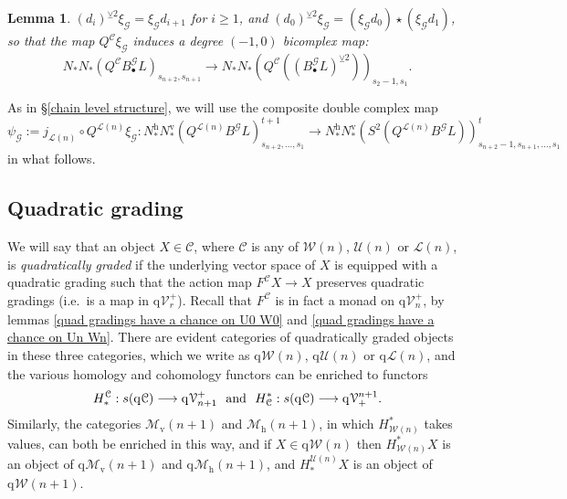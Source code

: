 \documentclass[11pt]{amsart} \renewcommand{\baselinestretch}{1.4}
\theoremstyle{plain}
\newtheorem{lem}[thm]{Lemma}
\theoremstyle{definition}
\renewcommand{\to}{\longrightarrow}
\newcommand{\scrG}{\mathscr{G}}
\newcommand{\calL}{\mathcal{L}}
\newcommand{\calV}{\mathcal{V}}
\newcommand{\calw}{\mathcal{W}}
\newcommand{\calu}{\mathcal{U}}
\newcommand{\call}{\mathcal{L}}
\newcommand{\calc}{\mathcal{C}}
\newcommand{\calMv}{\mathcal{M}\dver}
\newcommand{\calMh}{\mathcal{M}\dhor}
\newcommand{\vect}[2]{\calV^{#1}_{#2}}
\newcommand{\BSW}{{\scrG}}
\newcommand{\BSWres}{B^\BSW}%
\newcommand{\quadgrad}[1]{\mathrm{q}_{#1}}
\newcommand{\uver}{^\mathrm{v}}
\newcommand{\uhor}{^\mathrm{h}}
\newcommand{\dver}{_\mathrm{v}}
\newcommand{\dhor}{_\mathrm{h}}
\newcommand{\smashcoprod}{\veebar}%
\begin{document}
\begin{Composite functor spectral sequences}
\begin{lem}
$(d_i)^{\smashcoprod 2}\xi_\BSW =\xi_\BSW d_{i+1}$ for $i\geq1$, and $(d_0)^{\smashcoprod 2}\xi_\BSW = (\xi_\BSW d_{0})\star(\xi_\BSW d_{1})$, so that the map $Q^{\calc}\xi_\BSW $ induces a degree $(-1,0)$ bicomplex map:
\[N_*N_*(Q^{\calc}B^\BSW_{\bullet}L)_{s_{n+2},s_{n+1}}\to
  N_*N_*(Q^{\calc}((B^\BSW_{\bullet}L)^{\smashcoprod 2}))_{s_2-1,s_1}.\]
\end{lem}
As in \S\ref{chain level structure}, we will use the composite double complex map
\[\psi_\BSW:=j_{\calL(n)}\circ Q^{\calL(n)}\xi_\BSW:N\uhor_*N\uver_*(Q^{\calL(n)}\BSWres L)_{s_{n+2},\ldots,s_1}^{t+1}\to N\uhor_*N\uver_*(S^2(Q^{\calL(n)}\BSWres L))_{s_{n+2}-1,s_{n+1},\ldots,s_1}^{t}\]
in what follows.


\subsection{Quadratic grading}
\label{Quadratic grading}
We will say that an object $X\in\calc$, where $\calc$ is any of $\calw(n)$, $\calu(n)$ or $\call(n)$, is \emph{quadratically graded} if the underlying vector space of $X$ is equipped with a quadratic grading such that the action map
$F^{\calc}X\to X$ 
preserves quadratic gradings (i.e.\ is a map in $\quadgrad{}\vect{+}{r}$).
Recall that $F^{\calc}$ is in fact a monad on $\quadgrad{}\vect{+}{n}$, by lemmas \ref{quad gradings have a chance on U0 W0} and \ref{quad gradings have a chance on Un Wn}. There are evident categories of quadratically graded objects in these three categories, which we write as $\quadgrad{}\calw(n)$, $\quadgrad{}\calu(n)$ or $\quadgrad{}\call(n)$, and the various homology and cohomology functors can be enriched to functors
\[H_*^{\calc}:s(\quadgrad{}\calc)\to \quadgrad{}\vect{+}{n+1}\textup{ \ and \ }H^*_{\calc}:s(\quadgrad{}\calc)\to \quadgrad{}\vect{n+1}{+}.\]
Similarly, the categories $\calMv(n+1)$ and $\calMh(n+1)$, in which $H^*_{\calw(n)}$ takes values, can both be enriched in this way, and if $X\in\quadgrad{}\calw(n)$ then 
$H^*_{\calw(n)}X$ is an object of $\quadgrad{}\calMv(n+1)$ and $\quadgrad{}\calMh(n+1)$, and 
$H_*^{\calu(n)}X$ is an object of $\quadgrad{}\calw(n+1)$.


\end{Composite functor spectral sequences}
\end{document}
